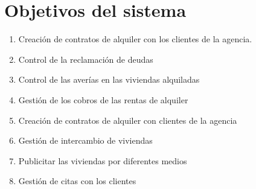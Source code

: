 \chapter{Objetivos del sistema}
\begin{enumerate}
\item Creación de contratos de alquiler con los clientes de la agencia.

\item Control de la reclamación de deudas

\item Control de las averías en las viviendas alquiladas

\item Gestión de los cobros de las rentas de alquiler

\item Creación de contratos de alquiler con clientes de la agencia

\item Gestión de intercambio de viviendas

\item Publicitar las viviendas por diferentes medios

\item Gestión de citas con los clientes
\end{enumerate}